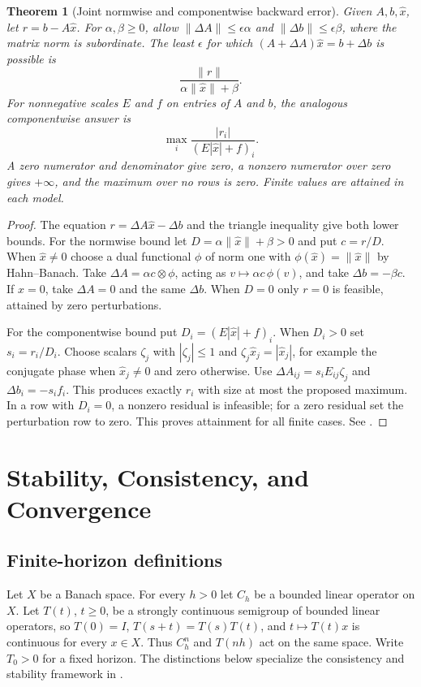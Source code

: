 \documentclass[11pt,oneside,openany]{book}
\theoremstyle{plain}
\newtheorem{theorem}{Theorem}[chapter]
\theoremstyle{definition}
\theoremstyle{remark}
\begin{document}
\begin{theorem}[Joint normwise and componentwise backward error]
\label{p206:W15}
Given \(A,b,\hat x\), let \(r=b-A\hat x\).
For \(\alpha,\beta\ge0\), allow
\(\|\Delta A\|\le\epsilon\alpha\) and
\(\|\Delta b\|\le\epsilon\beta\), where the matrix norm is
subordinate. The least \(\epsilon\) for which
\((A+\Delta A)\hat x=b+\Delta b\) is possible is
\[
                 \frac{\|r\|}{\alpha\|\hat x\|+\beta}.
\]
For nonnegative scales \(E\) and \(f\) on entries of \(A\)
and \(b\), the analogous componentwise answer is
\[
     \max_i\frac{|r_i|}{(E|\hat x|+f)_i}.
\]
A zero numerator and denominator give zero, a nonzero numerator
over zero gives \(+\infty\), and the maximum over no rows is zero.
Finite values are attained in each model.
\end{theorem}
\begin{proof}
The equation \(r=\Delta A\hat x-\Delta b\) and the triangle
inequality give both lower bounds. For the normwise bound let
\(D=\alpha\|\hat x\|+\beta>0\) and put \(c=r/D\).
When \(\hat x\ne0\) choose a dual functional \(\phi\) of norm one
with \(\phi(\hat x)=\|\hat x\|\) by Hahn--Banach.
Take \(\Delta A=\alpha c\otimes\phi\), acting as
\(v\mapsto\alpha c\,\phi(v)\), and take \(\Delta b=-\beta c\).
If \(\hat x=0\), take \(\Delta A=0\) and the same \(\Delta b\).
When \(D=0\) only \(r=0\) is feasible, attained by zero perturbations.

For the componentwise bound put \(D_i=(E|\hat x|+f)_i\).
When \(D_i>0\) set \(s_i=r_i/D_i\).
Choose scalars \(\zeta_j\) with \(|\zeta_j|\le1\) and
\(\zeta_j\hat x_j=|\hat x_j|\), for example the conjugate
phase when \(\hat x_j\ne0\) and zero otherwise.
Use \(\Delta A_{ij}=s_i E_{ij}\zeta_j\) and
\(\Delta b_i=-s_i f_i\). This produces exactly \(r_i\)
with size at most the proposed maximum. In a row with \(D_i=0\),
a nonzero residual is infeasible; for a zero residual set
the perturbation row to zero. This proves attainment for all
finite cases. See \cite[Sections 7.1--7.2]{higham}.
\end{proof}
\chapter{Stability, Consistency, and Convergence}

\section{Finite-horizon definitions}

Let \(X\) be a Banach space. For every \(h>0\) let \(C_h\) be
a bounded linear operator on \(X\). Let \(T(t)\), \(t\ge0\), be a
strongly continuous semigroup of bounded linear operators, so
\(T(0)=I\), \(T(s+t)=T(s)T(t)\), and \(t\mapsto T(t)x\) is
continuous for every \(x\in X\). Thus \(C_h^n\) and \(T(nh)\)
act on the same space. Write \(T_0>0\) for a fixed horizon.
The distinctions below specialize the consistency and stability
framework in \cite[Section 4.2]{trefpde}.
\end{document}
